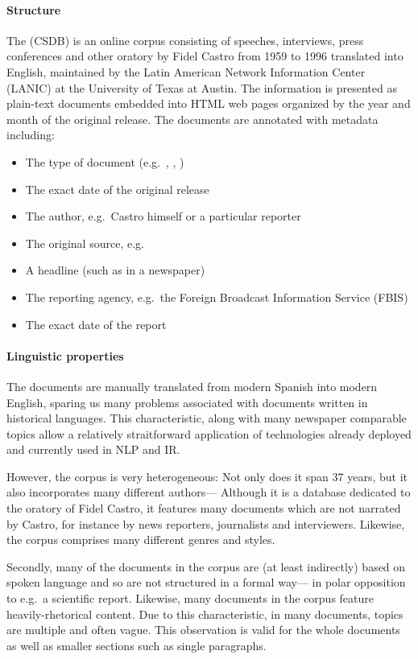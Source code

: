 \paragraph{Structure}
The  (CSDB) is an online corpus consisting of speeches, interviews, press conferences and other oratory by Fidel Castro from 1959 to 1996 translated into English, maintained by the Latin American Network Information Center (LANIC) at the University of Texas at Austin. The information is presented as plain-text documents embedded into HTML web pages organized by the year and month of the original release. The documents are annotated with metadata including:

\begin{itemize}
\item The type of document (e.g.\ , , )
\item The exact date of the original release
\item The author, e.g.\ Castro himself or a particular reporter
\item The original source, e.g.\ 
\item A headline (such as in a newspaper)
\item The reporting agency, e.g.\ the Foreign Broadcast Information Service (FBIS)
\item The exact date of the report
\end{itemize}

\paragraph{Linguistic properties}
The documents are manually translated from modern Spanish into modern English, sparing us many problems associated with documents written in historical languages. This characteristic, along with many newspaper comparable topics allow a relatively straitforward application of technologies already deployed and currently used in NLP and IR.

However, the corpus is very heterogeneous: Not only does it span 37 years, but it also incorporates many different authors--- Although it is a database dedicated to the oratory of Fidel Castro, it features many documents which are not narrated by Castro, for instance by news reporters, journalists and interviewers. Likewise, the corpus comprises many different genres and styles.

Secondly, many of the documents in the corpus are (at least indirectly) based on spoken language and so are not structured in a formal way--- in polar opposition to e.g.\ a scientific report. Likewise, many documents in the corpus feature heavily-rhetorical content. Due to this characteristic, in many documents, topics are multiple and often vague. This observation is valid for the whole documents as well as smaller sections such as single paragraphs. 

